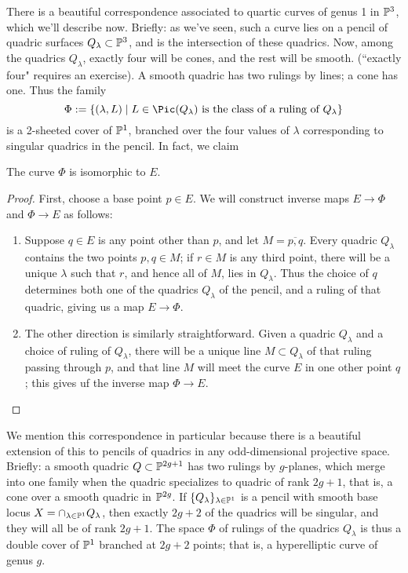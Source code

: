 There is a beautiful correspondence associated to quartic curves of genus 1 in $\PP^3$, which we'll describe now. Briefly: as we've seen, such a curve lies on a pencil of quadric surfaces $Q_\lambda \subset \PP^3$, and is the intersection of these quadrics. Now, among the quadrics $Q_\lambda$, exactly four will be cones, and the rest will be smooth. (``exactly four" requires an exercise). A smooth quadric has two rulings by lines; a cone has one. Thus the family
$$
\Phi := \{ (\lambda, L) \mid L \in \Pic(Q_\lambda) \text{ is the class of a ruling of } Q_\lambda \}
$$
is a 2-sheeted cover of $\PP^1$, branched over the four values of $\lambda$ corresponding to singular quadrics in the pencil. In fact, we claim

\begin{proposition}\label{rulings on pencil}
The curve $\Phi$ is isomorphic to $E$.
\end{proposition} 

\begin{proof}
First, choose a base point $p \in E$. We will construct inverse maps $E \to \Phi$ and $\Phi \to E$ as follows:
\begin{enumerate}
\item Suppose $q \in E$ is any point other than $p$, and let $M = \overline{p,q}$. Every quadric $Q_\lambda$ contains the two points $p, q \in M$; if $r \in M$ is any third point, there will be a unique $\lambda$ such that $r$, and hence all of $M$, lies in $Q_\lambda$. Thus the choice of $q$ determines both one of the quadrics $Q_\lambda$ of the pencil, and a ruling of that quadric, giving us a map $E \to \Phi$.
\item The other direction is similarly straightforward. Given a quadric $Q_\lambda$ and a choice of ruling of $Q_\lambda$, there will be a unique line $M \subset Q_\lambda$ of that ruling passing through $p$, and that line $M$ will meet the curve $E$ in one other point $q$; this gives uf the inverse map $\Phi \to E$.
\end{enumerate}
\end{proof}

We mention this correspondence in particular because there is a beautiful extension of this to pencils of quadrics in any odd-dimensional projective space. Briefly: a smooth quadric $Q \subset \PP^{2g+1}$ has two rulings by $g$-planes, which merge into one family when the quadric specializes to quadric of rank $2g+1$, that is, a cone over a smooth quadric in $\PP^{2g}$. If $\{Q_\lambda\}_{\lambda \in \PP^1}$ is a pencil with smooth base locus $X = \cap_{\lambda \in \PP^1} Q_\lambda$, then exactly $2g+2$ of the quadrics will be singular, and they will all be of rank $2g+1$. The space $\Phi$ of rulings of the quadrics $Q_\lambda$ is thus a double cover of $\PP^1$ branched at $2g+2$ points; that is, a hyperelliptic curve of genus $g$.


